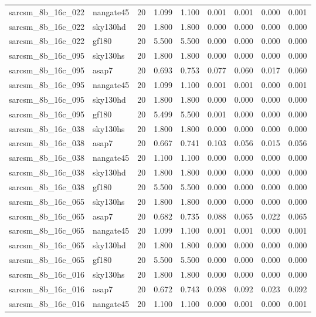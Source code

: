 \begin{tabular}{llrrrrrrr}
sarcsm\_8b\_16c\_022 & nangate45 & 20 & 1.099 & 1.100 & 0.001 & 0.001 & 0.000 & 0.001 \\
sarcsm\_8b\_16c\_022 & sky130hd & 20 & 1.800 & 1.800 & 0.000 & 0.000 & 0.000 & 0.000 \\
sarcsm\_8b\_16c\_022 & gf180 & 20 & 5.500 & 5.500 & 0.000 & 0.000 & 0.000 & 0.000 \\
sarcsm\_8b\_16c\_095 & sky130hs & 20 & 1.800 & 1.800 & 0.000 & 0.000 & 0.000 & 0.000 \\
sarcsm\_8b\_16c\_095 & asap7 & 20 & 0.693 & 0.753 & 0.077 & 0.060 & 0.017 & 0.060 \\
sarcsm\_8b\_16c\_095 & nangate45 & 20 & 1.099 & 1.100 & 0.001 & 0.001 & 0.000 & 0.001 \\
sarcsm\_8b\_16c\_095 & sky130hd & 20 & 1.800 & 1.800 & 0.000 & 0.000 & 0.000 & 0.000 \\
sarcsm\_8b\_16c\_095 & gf180 & 20 & 5.499 & 5.500 & 0.001 & 0.000 & 0.000 & 0.000 \\
sarcsm\_8b\_16c\_038 & sky130hs & 20 & 1.800 & 1.800 & 0.000 & 0.000 & 0.000 & 0.000 \\
sarcsm\_8b\_16c\_038 & asap7 & 20 & 0.667 & 0.741 & 0.103 & 0.056 & 0.015 & 0.056 \\
sarcsm\_8b\_16c\_038 & nangate45 & 20 & 1.100 & 1.100 & 0.000 & 0.000 & 0.000 & 0.000 \\
sarcsm\_8b\_16c\_038 & sky130hd & 20 & 1.800 & 1.800 & 0.000 & 0.000 & 0.000 & 0.000 \\
sarcsm\_8b\_16c\_038 & gf180 & 20 & 5.500 & 5.500 & 0.000 & 0.000 & 0.000 & 0.000 \\
sarcsm\_8b\_16c\_065 & sky130hs & 20 & 1.800 & 1.800 & 0.000 & 0.000 & 0.000 & 0.000 \\
sarcsm\_8b\_16c\_065 & asap7 & 20 & 0.682 & 0.735 & 0.088 & 0.065 & 0.022 & 0.065 \\
sarcsm\_8b\_16c\_065 & nangate45 & 20 & 1.099 & 1.100 & 0.001 & 0.001 & 0.000 & 0.001 \\
sarcsm\_8b\_16c\_065 & sky130hd & 20 & 1.800 & 1.800 & 0.000 & 0.000 & 0.000 & 0.000 \\
sarcsm\_8b\_16c\_065 & gf180 & 20 & 5.500 & 5.500 & 0.000 & 0.000 & 0.000 & 0.000 \\
sarcsm\_8b\_16c\_016 & sky130hs & 20 & 1.800 & 1.800 & 0.000 & 0.000 & 0.000 & 0.000 \\
sarcsm\_8b\_16c\_016 & asap7 & 20 & 0.672 & 0.743 & 0.098 & 0.092 & 0.023 & 0.092 \\
sarcsm\_8b\_16c\_016 & nangate45 & 20 & 1.100 & 1.100 & 0.000 & 0.001 & 0.000 & 0.001 \\

\end{tabular}
